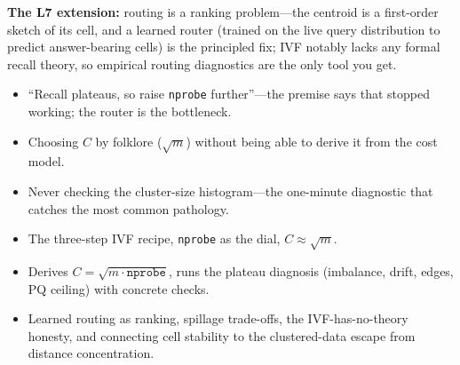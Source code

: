 \begin{interviewq}
\textbf{The L7 extension:} routing is a ranking problem---the centroid is a first-order sketch of its cell, and a learned router (trained on the live query distribution to predict answer-bearing cells) is the principled fix; IVF notably lacks any formal recall theory, so empirical routing diagnostics are the only tool you get.

\redflags
\begin{itemize}
    \item ``Recall plateaus, so raise \texttt{nprobe} further''---the premise says that stopped working; the router is the bottleneck.
    \item Choosing $C$ by folklore ($\sqrt{m}$) without being able to derive it from the cost model.
    \item Never checking the cluster-size histogram---the one-minute diagnostic that catches the most common pathology.
\end{itemize}


\goodgreat
\begin{itemize}
    \item {} The three-step IVF recipe, \texttt{nprobe} as the dial, $C \approx \sqrt{m}$.
    \item {} Derives $C = \sqrt{m \cdot \texttt{nprobe}}$, runs the plateau diagnosis (imbalance, drift, edges, PQ ceiling) with concrete checks.
    \item {} Learned routing as ranking, spillage trade-offs, the IVF-has-no-theory honesty, and connecting cell stability to the clustered-data escape from distance concentration.
\end{itemize}

\end{interviewq}


